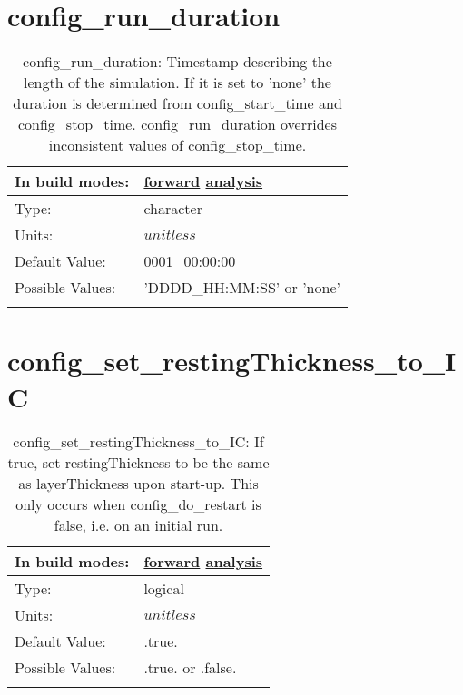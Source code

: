 \section[config\_run\_duration]{config\_run\_duration}
\label{sec:nm_sec_config_run_duration}
\begin{center}
\begin{longtable}{| p{2.0in} || p{4.0in} |}
    \hline
    In build modes: & \hyperref[subsec:forward_nm_tab_time_management]{forward} \hyperref[subsec:analysis_nm_tab_time_management]{analysis} \\
    \hline
    Type: & character \\
    \hline
    Units: & $unitless$ \\
    \hline
    Default Value: & 0001\_00:00:00 \\
    \hline
    Possible Values: & 'DDDD\_HH:MM:SS' or 'none' \\
    \hline
    \caption{config\_run\_duration: Timestamp describing the length of the simulation. If it is set to 'none' the duration is determined from config\_start\_time and config\_stop\_time. config\_run\_duration overrides inconsistent values of config\_stop\_time.}
\end{longtable}
\end{center}
\section[config\_set\_restingThickness\_to\_IC]{config\_set\_restingThickness\_to\_IC}
\label{sec:nm_sec_config_set_restingThickness_to_IC}
\begin{center}
\begin{longtable}{| p{2.0in} || p{4.0in} |}
    \hline
    In build modes: & \hyperref[subsec:forward_nm_tab_ALE_vertical_grid]{forward} \hyperref[subsec:analysis_nm_tab_ALE_vertical_grid]{analysis} \\
    \hline
    Type: & logical \\
    \hline
    Units: & $unitless$ \\
    \hline
    Default Value: & .true. \\
    \hline
    Possible Values: & .true. or .false. \\
    \hline
    \caption{config\_set\_restingThickness\_to\_IC: If true, set restingThickness to be the same as layerThickness upon start-up. This only occurs when config\_do\_restart is false, i.e. on an initial run.}
\end{longtable}
\end{center}

